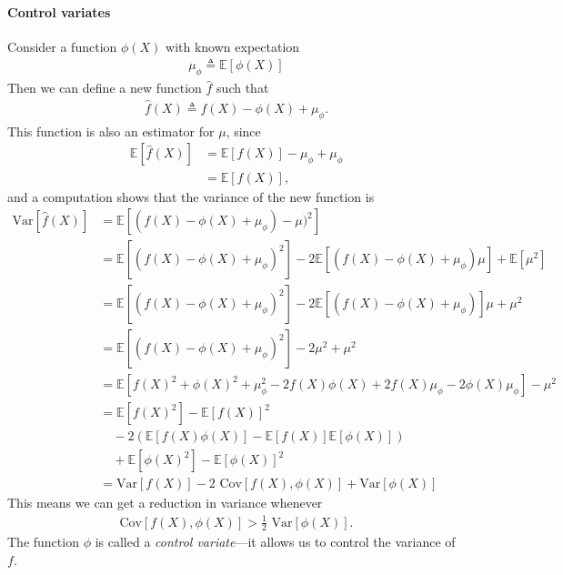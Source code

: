 \paragraph{Control variates} Consider a function $\phi(X)$ with known expectation
\begin{align*}
    \mu_{\phi} \triangleq \mathbb{E} [ \phi(X) ]
\end{align*}
Then we can define a new function $\hat{f}$ such that
\begin{align*}
    \hat{f}(X) \triangleq f(X) - \phi(X) + \mu_{\phi}.
\end{align*}
This function is also an estimator for $\mu$, since
\begin{align*}
    \mathbb{E}[ \hat{f}(X) ] &= \mathbb{E}[ f(X) ] - \mu_{\phi} + \mu_{\phi} \\
        &= \mathbb{E}[ f(X) ],
\end{align*}
and a computation shows that the variance of the new function is
\begin{align*}
    \text{Var}[ \hat{f}(X) ] &= \mathbb{E}[ (f(X) - \phi(X) + \mu_{\phi}) - \mu)^2 ] \\
    &= \mathbb{E}[ (f(X) - \phi(X) + \mu_{\phi})^2 ] - 2\mathbb{E}[ (f(X) - \phi(X) + \mu_{\phi})\mu ] + \mathbb{E}[ \mu^2 ] \\
    &= \mathbb{E}[ (f(X) - \phi(X) + \mu_{\phi})^2 ] - 2\mathbb{E}[ (f(X) - \phi(X) + \mu_{\phi})]\mu + \mu^2 \\
    &= \mathbb{E}[ (f(X) - \phi(X) + \mu_{\phi})^2 ] - 2\mu^2  + \mu^2 \\
    &= \mathbb{E}[ f(X)^2 + \phi(X)^2 + \mu_{\phi}^2 - 2f(X)\phi(X) + 2f(X)\mu_{\phi} - 2\phi(X)\mu_{\phi} ] - \mu^2\\
    &= \mathbb{E}[ f(X)^2 ] - \mathbb{E}[ f(X) ]^2 \\
    &\quad - 2(\mathbb{E}[ f(X)\phi(X) ] - \mathbb{E}[ f(X) ]\mathbb{E}[ \phi(X) ]) \\
    &\quad+ \mathbb{E}[ \phi(X)^2 ] - \mathbb{E}[ \phi(X) ]^2 \\
    &= \text{Var}[ f(X) ] - 2 \text{ Cov}[ f(X), \phi(X) ] + \text{Var}[ \phi(X) ]
\end{align*}
This means we can get a reduction in variance whenever
\begin{align*}
    \text{Cov}[ f(X), \phi(X) ] > \frac{1}{2}\text{ Var}[ \phi(X) ].
\end{align*}
The function $\phi$ is called a \textit{control variate}---it allows us to control the variance of $f$.

